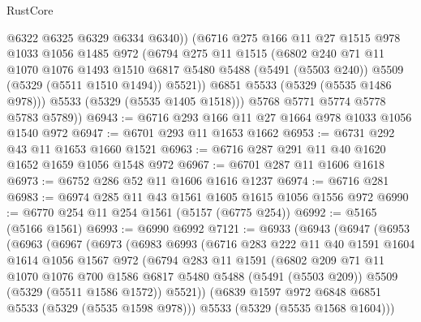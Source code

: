 \begin{lexlean}{RustCore}
\begin{coremodule}
              @6322
              @6325
              @6329
              @6334
              @6340))
          (@6716
            @275
            @166
            @11
            @27
            @1515
            @978
            @1033
            @1056
            @1485
            @972
            (@6794
              @275
              @11
              @1515
              (@6802
                @240
                @71
                @11
                @1070
                @1076
                @1493
                @1510
                @6817
                @5480
                @5488
                (@5491 (@5503 @240))
                @5509
                (@5329 (@5511 @1510 @1494))
                @5521))
            @6851
            @5533
            (@5329 (@5535 @1486 @978)))
          @5533
          (@5329 (@5535 @1405 @1518)))
        @5768
        @5771
        @5774
        @5778
        @5783
        @5789))
@6943 := @6716 @293 @166 @11 @27 @1664 @978 @1033 @1056 @1540 @972
@6947 := @6701 @293 @11 @1653 @1662
@6953 := @6731 @292 @43 @11 @1653 @1660 @1521
@6963 := @6716 @287 @291 @11 @40 @1620 @1652 @1659 @1056 @1548 @972
@6967 := @6701 @287 @11 @1606 @1618
@6973 := @6752 @286 @52 @11 @1606 @1616 @1237
@6974 := @6716 @281
@6983 := @6974 @285 @11 @43 @1561 @1605 @1615 @1056 @1556 @972
@6990 := @6770 @254 @11 @254 @1561 (@5157 (@6775 @254))
@6992 := @5165 (@5166 @1561)
@6993 := @6990 @6992
@7121 := @6933
    (@6943
      (@6947
        (@6953
          (@6963
            (@6967
              (@6973
                (@6983
                  @6993
                  (@6716
                    @283
                    @222
                    @11
                    @40
                    @1591
                    @1604
                    @1614
                    @1056
                    @1567
                    @972
                    (@6794
                      @283
                      @11
                      @1591
                      (@6802
                        @209
                        @71
                        @11
                        @1070
                        @1076
                        @700
                        @1586
                        @6817
                        @5480
                        @5488
                        (@5491 (@5503 @209))
                        @5509
                        (@5329 (@5511 @1586 @1572))
                        @5521))
                    (@6839 @1597 @972 @6848 @6851 @5533 (@5329 (@5535 @1598 @978)))
                    @5533
                    (@5329 (@5535 @1568 @1604)))

\end{coremodule}
\end{lexlean}
